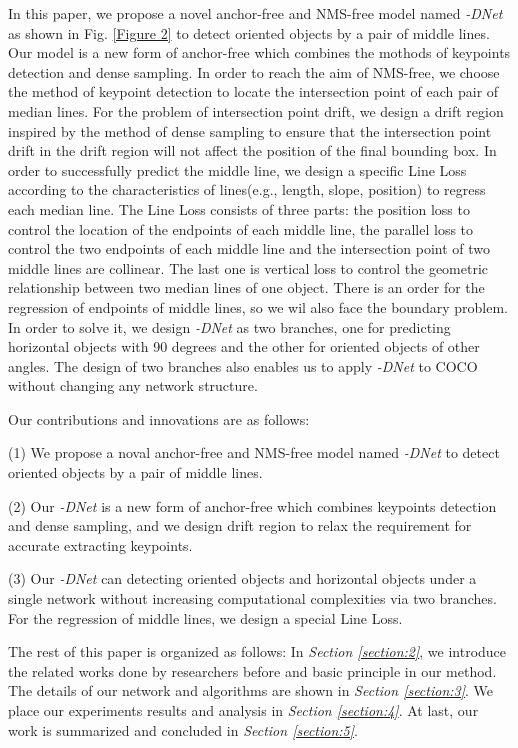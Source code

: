 \documentclass[runningheads]{llncs}
\begin{document}
In this paper, we propose a novel anchor-free and NMS-free model named \textit{-DNet} as shown in Fig. \ref{Figure 2} to detect oriented objects by a pair of middle lines. Our model is a new form of anchor-free which combines the mothods of keypoints detection and dense sampling.  In order to reach the aim of NMS-free, we choose the method of keypoint detection to locate the intersection point of each pair of median lines. For the problem of intersection point drift, we design a drift region inspired by the method of dense sampling to ensure that the intersection point drift in the drift region will not affect the position of the final bounding box.  In order to successfully predict the middle line, we design a specific Line Loss according to the characteristics of lines(e.g., length, slope, position) to regress each median line. The Line Loss consists of three parts: the position loss to control the location of the endpoints of each middle line, the parallel loss to control the two endpoints of each middle line and the intersection point of two middle lines are collinear. The last one is vertical loss to control the geometric relationship between two median lines of one object. There is an order for the regression of endpoints of middle lines, so we wil also face the boundary problem. In order to solve it, we design \textit{-DNet} as two branches, one for predicting horizontal objects with 90 degrees and the other for oriented objects of other angles. The design of two branches also enables us to apply \textit{-DNet} to COCO\cite{lin2014microsoft}  without changing any network structure.

Our contributions and innovations are as follows:

(1) We propose a noval anchor-free and NMS-free model named \textit{-DNet} to detect oriented objects by a pair of middle lines.

(2) Our \textit{-DNet} is a new form of anchor-free which combines keypoints detection and dense sampling, and we design drift region to relax the requirement for accurate extracting keypoints. 

(3) Our \textit{-DNet} can detecting oriented objects and horizontal objects under a single network without increasing computational complexities via two branches. For the regression of middle lines, we design a special Line Loss. 

The rest of this paper is organized as follows: In  {\color{red}\textit{Section \ref{section:2}}}, we introduce the related works done by researchers before and basic principle in our method. The details of our network and algorithms are shown in {\color{red}\textit{Section \ref{section:3}}}. We place our experiments results and analysis in {\color{red}\textit{Section \ref{section:4}}}. At last, our work is summarized and concluded in {\color{red}\textit{Section \ref{section:5}}}.
\end{document}
